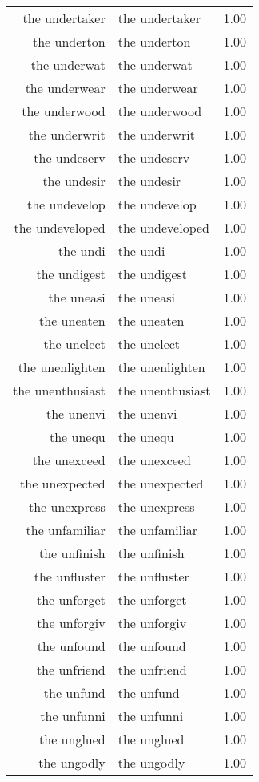 \begin{table}[ht]
\begin{tabular}{rlr}
  the undertaker & the undertaker & 1.00 \\ 
  the underton & the underton & 1.00 \\ 
  the underwat & the underwat & 1.00 \\ 
  the underwear & the underwear & 1.00 \\ 
  the underwood & the underwood & 1.00 \\ 
  the underwrit & the underwrit & 1.00 \\ 
  the undeserv & the undeserv & 1.00 \\ 
  the undesir & the undesir & 1.00 \\ 
  the undevelop & the undevelop & 1.00 \\ 
  the undeveloped & the undeveloped & 1.00 \\ 
  the undi & the undi & 1.00 \\ 
  the undigest & the undigest & 1.00 \\ 
  the uneasi & the uneasi & 1.00 \\ 
  the uneaten & the uneaten & 1.00 \\ 
  the unelect & the unelect & 1.00 \\ 
  the unenlighten & the unenlighten & 1.00 \\ 
  the unenthusiast & the unenthusiast & 1.00 \\ 
  the unenvi & the unenvi & 1.00 \\ 
  the unequ & the unequ & 1.00 \\ 
  the unexceed & the unexceed & 1.00 \\ 
  the unexpected & the unexpected & 1.00 \\ 
  the unexpress & the unexpress & 1.00 \\ 
  the unfamiliar & the unfamiliar & 1.00 \\ 
  the unfinish & the unfinish & 1.00 \\ 
  the unfluster & the unfluster & 1.00 \\ 
  the unforget & the unforget & 1.00 \\ 
  the unforgiv & the unforgiv & 1.00 \\ 
  the unfound & the unfound & 1.00 \\ 
  the unfriend & the unfriend & 1.00 \\ 
  the unfund & the unfund & 1.00 \\ 
  the unfunni & the unfunni & 1.00 \\ 
  the unglued & the unglued & 1.00 \\ 
  the ungodly & the ungodly & 1.00 \\ 

\end{tabular}
\end{table}
